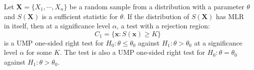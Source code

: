 \documentclass{huhtakm-template-book-v2}
\begin{document}
\newpage
\begin{thm}
	\label{Chapter 4 (Theorem) Karlin-Rubin Theorem for sufficient statistic}
	Let $\mathbf{X}=\{X_{1},\cdots,X_{n}\}$ be a random sample from a distribution with a parameter $\theta$ and $S(\mathbf{X})$ is a sufficient statistic for $\theta$. If the distribution of $S(\mathbf{X})$ has MLR in itself, then at a significance level $\alpha$, a test with a rejection region:
	\begin{equation*}
		C_{1}=\{\mathbf{x}:S(\mathbf{x})\geq K\}
	\end{equation*}
	is a UMP one-sided right test for $H_{0}:\theta\leq\theta_{0}$ against $H_{1}:\theta>\theta_{0}$ at a significance level $\alpha$ for some $K$. The test is also a UMP one-sided right test for $H_{0}:\theta=\theta_{0}$ against $H_{1}:\theta>\theta_{0}$.
\end{thm}
\end{document}
